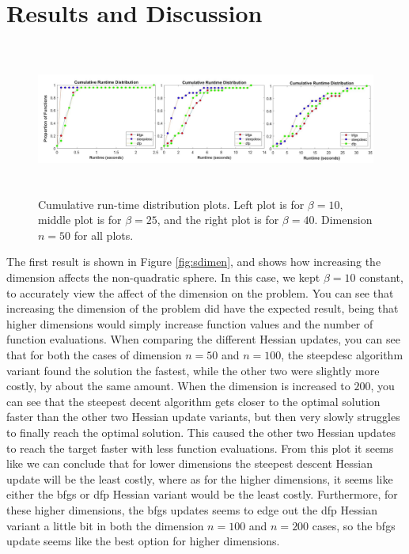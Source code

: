 \documentclass[sigconf, 7pt]{acmart}
\begin{document}
\section{Results and Discussion}
\label{result}


\begin{figure}[b]
\centering
  \includegraphics[height = 5cm, width=\linewidth]{CumDisBeta1.jpg}
  \caption{Cumulative run-time distribution plots. Left plot is for $\beta = 10$, middle plot is for $\beta = 25$, and the right plot is for $\beta = 40$. Dimension $n=50$ for all plots.}
  \label{fig:beta}
\end{figure}

The first result is shown in Figure \ref{fig:sdimen}, and shows how increasing the dimension affects the non-quadratic sphere. In this case, we kept $\beta = 10$ constant, to accurately view the affect of the dimension on the problem. You can see that increasing the dimension of the problem did have the expected result, being that higher dimensions would simply increase function values and the number of function evaluations. When comparing the different Hessian updates, you can see that for both the cases of dimension $n = 50$ and $n = 100$, the steepdesc algorithm variant found the solution the fastest, while the other two were slightly more costly, by about the same amount. When the dimension is increased to $200$, you can see that the steepest decent algorithm gets closer to the optimal solution faster than the other two Hessian update variants, but then very slowly struggles to finally reach the optimal solution. This caused the other two Hessian updates to reach the target faster with less function evaluations. From this plot it seems like we can conclude that for lower dimensions the steepest descent Hessian update will be the least costly, where as for the higher dimensions, it seems like either the bfgs or dfp Hessian variant would be the least costly. Furthermore, for these higher dimensions, the bfgs updates seems to edge out the dfp Hessian variant a little bit in both the dimension $n=100$ and $n=200$ cases, so the bfgs update seems like the best option for higher dimensions.
\end{document}
